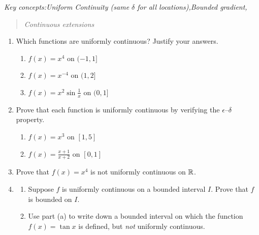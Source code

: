 \begin{exercises}
	\emph{Key concepts:\quad Uniform Continuity (same $\delta$ for all locations),\quad Bounded gradient,}\vspace{-5pt}
	\begin{quote}
		\emph{Continuous extensions}
	\end{quote}
	
	\begin{enumerate}%
	  \item Which functions are uniformly continuous? Justify your answers.
	  \begin{enumerate}
	    \item {}
	    $f(x)=x^4$ on $(-1,1]$
	    \setcounter{enumii}{2}
	    \item \makebox[200pt][l]{$f(x)=x^{-4}$ on $(0,2]$\hfill (d) }
	    $f(x)=x^{-4}$ on $(1,2]$
	    \setcounter{enumii}{4}
	    \item $f(x)=x^2\sin\frac 1x$ on $(0,1]$
	  \end{enumerate}
	  
	  
	  \item Prove that each function is uniformly continuous by verifying the $\epsilon$--$\delta$ property.
	  \begin{enumerate}
	    \item {}
	    $f(x)=x^3$ on $[1,5]$
	    \setcounter{enumii}{2}
	    \item {}
	    $f(x)=\frac{x+1}{x+2}$ on $[0,1]$
	  \end{enumerate}
	  
	  
	  \item Prove that $f(x)=x^4$ is not uniformly continuous on $\mathbb{R}$.
	  
	  
	  \item\begin{enumerate}
	     \item Suppose $f$ is uniformly continuous on a bounded interval $I$. Prove that $f$ is bounded on $I$.
	     \item Use part (a) to write down a bounded interval on which the function $f(x)=\tan x$ is defined, but \emph{not} uniformly continuous.
	  \end{enumerate}
	

\end{enumerate}
\end{exercises}
